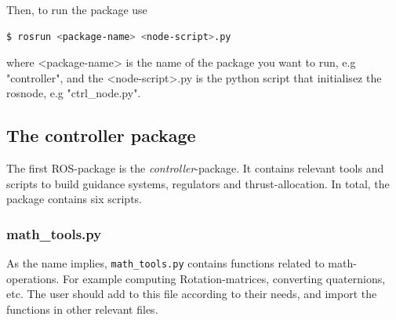 Then, to run the package use

\begin{lstlisting}[language=bash,basicstyle=\mlttfamily, breaklines=true]
  $ rosrun <package-name> <node-script>.py
\end{lstlisting}

where <package-name> is the name of the package you want to run, e.g "controller", and the <node-script>.py is the python script that initialisez the rosnode, e.g "ctrl\_node.py". 


\subsection{The controller package}
The first ROS-package is the \textit{controller}-package. It contains relevant tools and scripts to build guidance systems, regulators and thrust-allocation. In total, the package contains six scripts.

\subsubsection{math\_tools.py}
As the name implies, \lstinline{math_tools.py} contains functions related to math-operations. For example computing Rotation-matrices, converting quaternions, etc. The user should add to this file according to their needs, and import the functions in other relevant files. 

